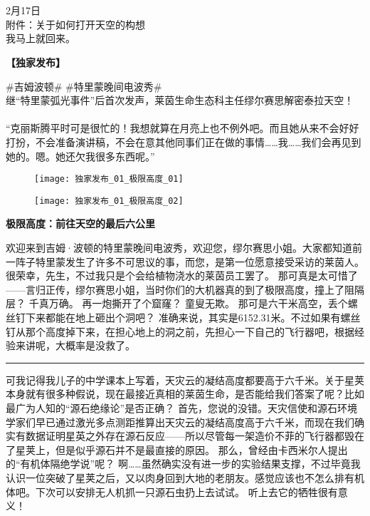 \documentclass[openany]{book}
\begin{document}
\\
\\
{
2月17日\\
附件：关于如何打开天空的构想\\
我马上就回来。}
\clearpage

\begin{center} \textbf{【独家发布】}\end{center}
\#吉姆波顿\# \#特里蒙晚间电波秀\#\\
继“特里蒙弧光事件”后首次发声，莱茵生命生态科主任缪尔赛思解密泰拉天空！\\
\\
“克丽斯腾平时可是很忙的！我想就算在月亮上也不例外吧。而且她从来不会好好打扮，不会准备演讲稿，不会在意其他同事们正在做的事情……我……我们会再见到她的。嗯。她还欠我很多东西呢。”\\
\begin{figure}[h]
    \centering
    \texttt{[image: 独家发布\_01\_极限高度\_01]}
\end{figure}
\begin{figure}[h]
    \centering
    \texttt{[image: 独家发布\_01\_极限高度\_02]}
\end{figure}
\begin{center} \textbf{极限高度：前往天空的最后六公里}\end{center}
\begin{dialogue}
     欢迎来到吉姆·波顿的特里蒙晚间电波秀，欢迎您，缪尔赛思小姐。大家都知道前一阵子特里蒙发生了许多不可思议的事，而您，是第一位愿意接受采访的莱茵人。
     很荣幸，先生，不过我只是个会给植物浇水的莱茵员工罢了。
     那可真是太可惜了——言归正传，缪尔赛思小姐，当时你们的大机器真的到了极限高度，撞上了阻隔层？
     千真万确。
     再一炮撕开了个窟窿？
     童叟无欺。
     那可是六干米高空，丢个螺丝钉下来都能在地上砸出个洞吧？
     准确来说，其实是6152.31米。不过如果有螺丝钉从那个高度掉下来，在担心地上的洞之前，先担心一下自己的飞行器吧，根据经验来讲呢，大概率是没救了。
    \par\noindent\rule{\textwidth}{0.4pt}
     可我记得我儿子的中学课本上写着，天灾云的凝结高度都要高于六千米。关于星荚本身就有很多种假说，现在最接近真相的莱茵生命，是否能给我们答案了呢？比如最广为人知的“源石绝缘论”是否正确？
     首先，您说的没错。天灾信使和源石环境学家们早已通过激光多点测距推算出天灾云的凝结高度高于六千米，而现在我们确实有数据证明星英之外存在源石反应——所以尽管每一架造价不菲的飞行器都毁在了星荚上，但是似乎源石并不是最直接的原因。
     那么，曾经由卡西米尔人提出的“有机体隔绝学说”呢？
     啊……虽然确实没有进一步的实验结果支撑，不过毕竟我认识一位突破了星荚之后，又以肉身回到大地的老朋友。感觉应该也不怎么排有机体吧。下次可以安排无人机抓一只源石虫扔上去试试。
     听上去它的牺牲很有意义！
\end{dialogue}
\end{document}
